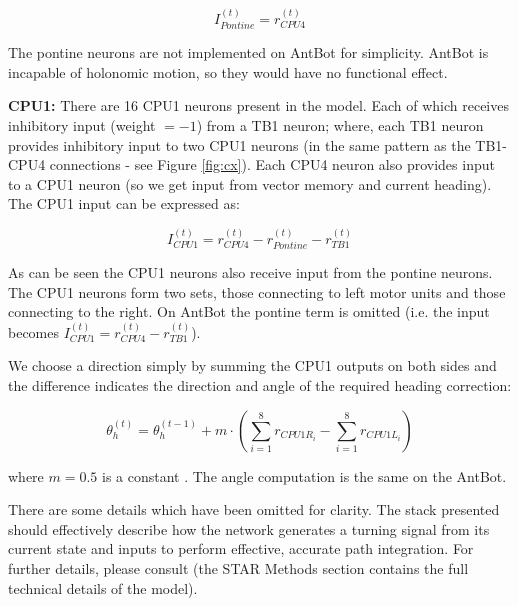 \documentclass[a4paper,11pt,twoside,openright]{article}
\begin{document}
\begin{equation}
  I_{Pontine}^{(t)} = r_{CPU4}^{(t)}
\end{equation}

The pontine neurons are not implemented on AntBot for simplicity. AntBot is
incapable of holonomic motion, so they would have no functional effect.
\newline
\par

\textbf{CPU1:}
There are 16 CPU1 neurons present in the model. Each of which
receives inhibitory input (weight $= -1$) from a TB1 neuron; where, each
TB1 neuron provides inhibitory input to two CPU1 neurons (in the same pattern
as the TB1-CPU4 connections - see Figure \ref{fig:cx}). Each CPU4 neuron also
provides input to a CPU1 neuron (so we get input from vector memory and current
heading). The CPU1 input can be expressed as:

\begin{equation}
  I_{CPU1}^{(t)} = r_{CPU4}^{(t)} - r_{Pontine}^{(t)} - r_{TB1}^{(t)}
\end{equation}

As can be seen the CPU1 neurons also receive input from the pontine neurons.
The CPU1 neurons form two sets, those connecting to left motor units and those
connecting to the right. On AntBot the pontine term is omitted
(i.e. the input becomes
$I_{CPU1}^{(t)} = r_{CPU4}^{(t)} - r_{TB1}^{(t)}$).
\newline
\par

We choose a direction simply by summing the CPU1 outputs on both sides and the
difference indicates the direction and angle of the required heading correction:

\begin{equation}
  \theta_h^{(t)} = \theta_h^{(t - 1)} +
  m \cdot (\sum_{i = 1}^{8} r_{CPU1R_{i}} - \sum_{i = 1}^{8} r_{CPU1L_{i}})
\end{equation}

where $m = 0.5$ is a constant \cite{Stone2017}. The angle computation is the
same on the AntBot.
\newline
\par

There are some details which have been omitted for clarity. The stack presented
should effectively describe how the network generates a turning signal from its
current state and inputs to perform effective, accurate path integration. For
further details, please consult \cite{Stone2017} (the STAR Methods section
contains the full technical details of the model).
\end{document}
